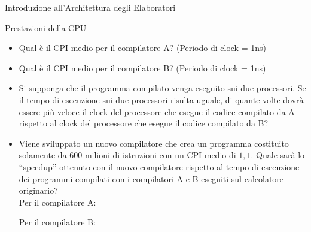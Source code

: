\documentclass[11pt]{article}
\begin{document}
\begin{quiz}{Introduzione all'Architettura degli Elaboratori}
\begin{cloze}[points=1,shuffle=false]{Prestazioni della CPU}
\begin{itemize}
\item Qual è il CPI medio per il compilatore A? (Periodo di clock = 1ns)
\item Qual è il CPI medio per il compilatore B? (Periodo di clock = 1ns) 
\item Si supponga che il programma compilato venga eseguito sui due processori. Se il tempo di esecuzione sui due processori risulta uguale, di quante volte dovrà essere più veloce il clock del processore che esegue il codice compilato da A rispetto al
clock del processore che esegue il codice compilato da B?
\item Viene sviluppato un nuovo compilatore che crea un programma costituito solamente da 600 milioni di istruzioni con un CPI medio di $1,1$. Quale sarà lo ``speedup'' ottenuto con il nuovo compilatore rispetto al tempo di esecuzione dei programmi compilati con i compilatori A e B eseguiti sul calcolatore originario?\\
Per il compilatore A: 
Per il compilatore B: 
\end{itemize}
\end{cloze}


\end{quiz}
\end{document}

